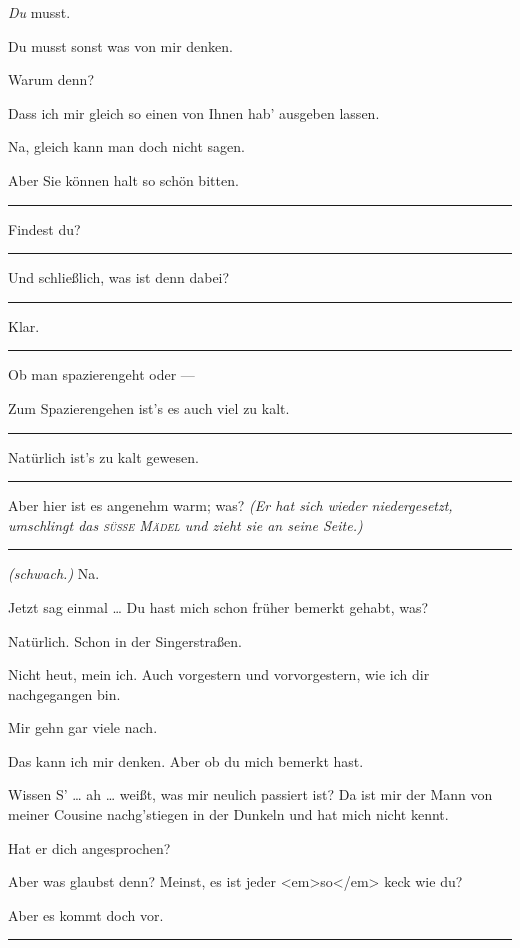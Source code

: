 \documentclass[
	final,
	a4paper,
	ngerman,
	mpinclude = true, %
	twoside = true,
	open = right,
	cleardoublepage = plain,
	DIV = 13,
	BCOR = 1cm,
	titlepage = firstiscover,
	]{scrbook}
\newcommand{\direction}[1]{\textit{(#1)}}
\newenvironment{deletion}{%
		\vspace{0.25\baselineskip}
		\hrule
		\vspace{0.25\baselineskip}
		\color{darkgray}
	}{
		\color{black}
		\vspace{0.25\baselineskip}
		\hrule 
		\vspace{0.25\baselineskip}
	}
\newcommand{\thecharacter}[1]{\textup{\textsc{#1}}\xspace}
\newcommand{\thegatte}{\thecharacter{Christian}}
\newcommand{\thesuesse}{\thecharacter{Lola}}
\newcommand{\character}[1]{\item[#1:]}
\newcommand{\gatte}{\character{\thegatte}}
\newcommand{\suesse}{\character{\thesuesse}}
\begin{document}
\begin{play}
	\gatte
	\emph{Du} musst.

	\suesse
	Du musst sonst was von mir denken.

	\gatte
	Warum denn?

	\suesse
	Dass ich mir gleich so einen von Ihnen hab' ausgeben lassen.

	\gatte
	Na, gleich kann man doch nicht sagen.

	\suesse
	Aber Sie können halt so schön bitten.
	\begin{deletion}

	\gatte
	Findest du?

	\suesse
	\end{deletion}
	Und schließlich, was ist denn dabei?
	\begin{deletion}

	\gatte
	Klar.

	\suesse
	\end{deletion}
	Ob man spazierengeht oder ---

	\gatte
	Zum Spazierengehen ist's es auch viel zu kalt.
	\begin{deletion}

	\suesse
	Natürlich ist's zu kalt gewesen.

	\gatte
	\end{deletion}
	Aber hier ist es angenehm warm; was? \direction{Er hat sich wieder niedergesetzt, umschlingt das \textsc{süße Mädel} und zieht sie an seine Seite.}
	\begin{deletion}

	\suesse
	\direction{schwach.} Na.

	\gatte
	Jetzt sag einmal \ldots{} Du hast mich schon früher bemerkt gehabt, was?

	\suesse
	Natürlich. Schon in der Singerstraßen.

	\gatte
	Nicht heut, mein ich. Auch vorgestern und vorvorgestern, wie ich dir nachgegangen bin.

	\suesse
	Mir gehn gar viele nach.

	\gatte
	Das kann ich mir denken. Aber ob du mich bemerkt hast.

	\suesse
	Wissen S' \ldots{} ah \ldots{} weißt, was mir neulich passiert ist? Da ist mir der Mann von meiner Cousine nachg'stiegen in der Dunkeln und hat mich nicht kennt.

	\gatte
	Hat er dich angesprochen?

	\suesse
	Aber was glaubst denn? Meinst, es ist jeder <em>so</em> keck wie du?

	\gatte
	Aber es kommt doch vor.


\end{deletion}
\end{play}
\end{document}
